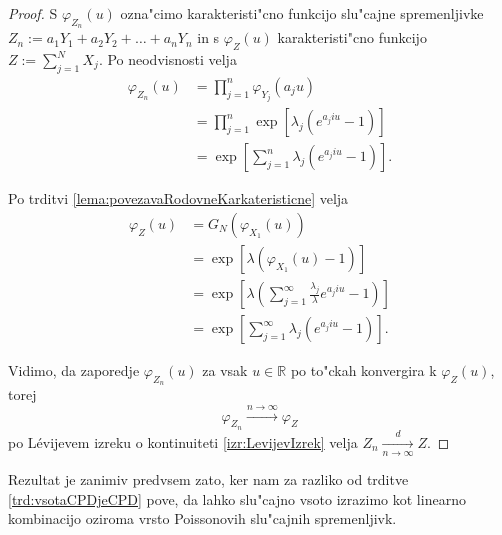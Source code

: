 \documentclass[12pt, a4paper, reqno]{amsart}
\theoremstyle{definition}
\theoremstyle{plain}
\newcommand{\R}{\mathbb{R}}
\newcommand{\1}{\mathds{1}}
\newcommand*{\refPriloga}[1]{%
  \begingroup
    \hypersetup{
      linkcolor=properpurple,
      linkbordercolor=properpurple,
    }%
    \ref{#1}%
  \endgroup
}
\begin{document}
    \begin{proof}
        S $\varphi_{Z_n}(u)$ ozna"cimo karakteristi"cno funkcijo slu"cajne spremenljivke 
        $Z_n := a_1Y_1 + a_2Y_2 + \dots + a_nY_n$ in s $\varphi_{Z}(u)$ karakteristi"cno funkcijo
        $Z:= \sum_{j=1}^{N}X_j$. Po neodvisnosti velja
        \begin{align*}
            \varphi_{Z_n}(u) 
                    &= \prod_{j=1}^{n}\varphi_{Y_j}(a_ju)\\
                    &= \prod_{j=1}^{n}\exp\left[\lambda_j\left(e^{a_j i u} - 1\right)\right] \\
                    &= \exp\left[\sum_{j=1}^{n}\lambda_j\left(e^{a_j i u} - 1\right)\right].
        \end{align*}

        \noindent
        Po trditvi  \ref{lema:povezavaRodovneKarkateristicne} velja
        \begin{align*}
            \varphi_{Z}(u) 
                    &= G_N\left(\varphi_{X_1}(u)\right) \\
                    &= \exp\left[\lambda\left(\varphi_{X_1}(u) - 1\right)\right] \\
                    & = \exp\left[\lambda\left(\sum_{j=1}^\infty\frac{\lambda_j}{\lambda}e^{a_jiu} - 1\right)\right]\\
                    &= \exp\left[\sum_{j=1}^{\infty}\lambda_j\left(e^{a_j i u} - 1\right)\right].
        \end{align*}

        \noindent 
        Vidimo, da zaporedje $\varphi_{Z_n}(u)$ za vsak $u\in\R$ po to"ckah konvergira k $\varphi_{Z}(u)$, torej
        \begin{equation*}
            \varphi_{Z_n} \xrightarrow{n\to\infty}\varphi_Z
        \end{equation*}
        po Lévijevem izreku o kontinuiteti \refPriloga{izr:LevijevIzrek} velja $Z_n \xrightarrow[n\to\infty]{d}Z$.
    \end{proof}

    Rezultat je zanimiv predvsem zato, ker nam za razliko od trditve \ref{trd:vsotaCPDjeCPD} pove, da 
    lahko slu"cajno vsoto izrazimo kot linearno kombinacijo oziroma vrsto Poissonovih slu"cajnih spremenljivk.
\end{document}
